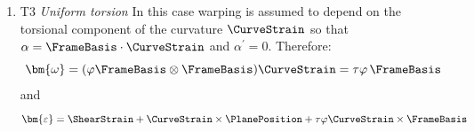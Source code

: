 \begin{enumerate}
$$
\hat{\bm{B}}\mathbf{P} = \left[\begin{matrix}
1 & 0 & 0 & 0 & z & - y & \varphi \\
0 & \psi_{y,y} + 1 & \psi_{z,y} & \varphi_{,y} - z & 0 & 0 & 0 \\
0 & \psi_{y,z} & \psi_{z,z} + 1 & \varphi_{,z} + y & 0 & 0 & 0 
\end{matrix}\right]
$$
Described by \cite[Section 3.1.2]{lecorvec2012nonlinear} with \(k_y \beta  \triangleq 1+\psi_{y,y}\). This model was also employed by \cite[Equation 3.51]{dire20173d}.
For a homogeneous section with linear-elastic St.Venant-Kirchhoff material  and \textbf{Linear} section kinematics one has:
\begin{equation*}
\hat{\mathbf{K}} = \left[\begin{array}{ccc|ccc|c}
E A & 0 & 0 & 0 & E Q_{y} & E Q_{z} & E R_{w}\\
0 & G A_{y} & 0 & G (Q_{yx} + R_{y}) & 0 & 0 & 0\\
0 & 0 & G A_{z} & G (Q_{zx} + R_{z}) & 0 & 0 & 0\\ \hline
0 & G Q_{yx} + G R_{y} & G Q_{zx} + G R_{z} & G (C_{a} + I_{0} + 2 S_{a}) & 0 & 0 & 0\\
E Q_{y} & 0 & 0 & 0 & E I_{y} & - E I_{yz} & E S_{y}\\
E Q_{z} & 0 & 0 & 0 & - E I_{yz} & E I_{z} & E S_{z}\\ \hline
E R_{w} & 0 & 0 & 0 & E S_{y} & E S_{z} & E C_{w}
\end{array}\right]
\end{equation*}
%
Note that this generalizes the work of \cite{saritas2006mixed}, as presented in Equation~3.23 of \cite{dire20173d}.

\item T3 \emph{Uniform torsion} In this case warping is assumed to depend on the torsional component of the curvature $\CurveStrain $ so that $\alpha = \FrameBasis\cdot\CurveStrain $ and $\alpha^{\prime}=0$. Therefore:
$$
\bm{\omega} = (\varphi \FrameBasis\otimes\FrameBasis)\CurveStrain  = \tau \varphi \, \FrameBasis
$$
and
$$
\bm{\varepsilon} = \ShearStrain  + \CurveStrain \times\PlanePosition  + \tau\varphi \CurveStrain \times\FrameBasis
$$


\end{enumerate}
